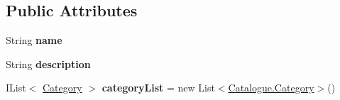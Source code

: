 \subsection*{Public Attributes}
\begin{DoxyCompactItemize}
\item 
\hypertarget{classcom_1_1shephertz_1_1app42_1_1paas_1_1sdk_1_1csharp_1_1shopping_1_1_catalogue_aec65e6673f4248a09694dc73f2ee3ec1}{String {\bfseries name}}\label{classcom_1_1shephertz_1_1app42_1_1paas_1_1sdk_1_1csharp_1_1shopping_1_1_catalogue_aec65e6673f4248a09694dc73f2ee3ec1}

\item 
\hypertarget{classcom_1_1shephertz_1_1app42_1_1paas_1_1sdk_1_1csharp_1_1shopping_1_1_catalogue_a1b445edcbe96ce6af209d8ef8d98676e}{String {\bfseries description}}\label{classcom_1_1shephertz_1_1app42_1_1paas_1_1sdk_1_1csharp_1_1shopping_1_1_catalogue_a1b445edcbe96ce6af209d8ef8d98676e}

\item 
\hypertarget{classcom_1_1shephertz_1_1app42_1_1paas_1_1sdk_1_1csharp_1_1shopping_1_1_catalogue_a270b09786b19c7e68daea8515a82c46e}{I\+List$<$ \hyperlink{classcom_1_1shephertz_1_1app42_1_1paas_1_1sdk_1_1csharp_1_1shopping_1_1_catalogue_1_1_category}{Category} $>$ {\bfseries category\+List} = new List$<$\hyperlink{classcom_1_1shephertz_1_1app42_1_1paas_1_1sdk_1_1csharp_1_1shopping_1_1_catalogue_1_1_category}{Catalogue.\+Category}$>$()}\label{classcom_1_1shephertz_1_1app42_1_1paas_1_1sdk_1_1csharp_1_1shopping_1_1_catalogue_a270b09786b19c7e68daea8515a82c46e}

\end{DoxyCompactItemize}
